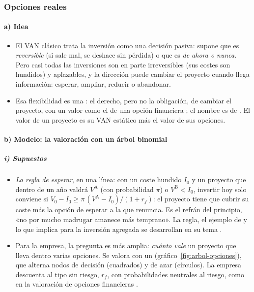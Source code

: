 \documentclass[11pt]{article}
\begin{document}
\subsubsection{Opciones reales}\label{sec:opciones-reales}

\paragraph{a) Idea}

\begin{itemize}
\item El VAN clásico trata la inversión como una decisión pasiva: supone que es \emph{reversible} (si sale mal, se deshace sin pérdida) o que es \emph{de ahora o nunca}\nocite{DixitPindyck1994}. Pero casi todas las inversiones son en parte irreversibles (sus costes son hundidos) y aplazables, y la dirección puede cambiar el proyecto cuando llega información: esperar, ampliar, reducir o abandonar.
\item Esa flexibilidad es una : el derecho, pero no la obligación, de cambiar el proyecto, con un valor como el de una opción financiera ; el nombre es de \textcite{Myers1977Determinants}. El valor de un proyecto es su VAN estático más el valor de sus opciones\nocite{Trigeorgis1996Real}.
\end{itemize}

\paragraph{b) Modelo: la valoración con un árbol binomial}

\subparagraph{i) Supuestos}

\begin{itemize}
\item \emph{La regla de esperar}, en una línea: con un coste hundido $I_0$ y un proyecto que dentro de un año valdrá $V^{\mathrm A}$ (con probabilidad $\pi$) o $V^{\mathrm B}<I_0$, invertir hoy solo conviene si $V_0-I_0\geq\pi\,(V^{\mathrm A}-I_0)/(1+r_f)$: el proyecto tiene que cubrir su coste más la opción de esperar a la que renuncia. Es el refrán del principio, «no por mucho madrugar amanece más temprano». La regla, el ejemplo de \textcite{Pindyck1991Irreversibility} y lo que implica para la inversión agregada se desarrollan en su tema .
\item Para la empresa, la pregunta es más amplia: \emph{cuánto vale} un proyecto que lleva dentro varias opciones. Se valora con un  (gráfico~\ref{fig:arbol-opciones}), que alterna nodos de decisión (cuadrados) y de azar (círculos). La empresa descuenta al tipo sin riesgo, $r_f$, con probabilidades neutrales al riesgo, como en la valoración de opciones financieras .
\end{itemize}
\end{document}
